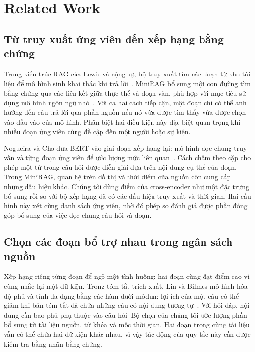 \section{Related Work}

\subsection{Từ truy xuất ứng viên đến xếp hạng bằng chứng}
Trong kiến trúc RAG của Lewis và cộng sự, bộ truy xuất tìm các đoạn từ kho tài liệu để mô hình sinh khai thác khi trả lời~\cite{lewis2020rag}. MiniRAG bổ sung một con đường tìm bằng chứng qua các liên kết giữa thực thể và đoạn văn, phù hợp với mục tiêu sử dụng mô hình ngôn ngữ nhỏ~\cite{fan2025minirag}. Với cả hai cách tiếp cận, một đoạn chỉ có thể ảnh hưởng đến câu trả lời qua phần nguồn nếu nó vừa được tìm thấy vừa được chọn vào đầu vào của mô hình. Phân biệt hai điều kiện này đặc biệt quan trọng khi nhiều đoạn ứng viên cùng đề cập đến một người hoặc sự kiện.

Nogueira và Cho đưa BERT vào giai đoạn xếp hạng lại: mô hình đọc chung truy vấn và từng đoạn ứng viên để ước lượng mức liên quan~\cite{nogueira2019passage}. Cách chấm theo cặp cho phép một từ trong câu hỏi được diễn giải dựa trên nội dung cụ thể của đoạn. Trong MiniRAG, quan hệ trên đồ thị và thời điểm của nguồn còn cung cấp những dấu hiệu khác. Chúng tôi dùng điểm của cross-encoder như một đặc trưng bổ sung rồi so với bộ xếp hạng đã có các dấu hiệu truy xuất và thời gian. Hai cấu hình này xét cùng danh sách ứng viên, nhờ đó phép so đánh giá được phần đóng góp bổ sung của việc đọc chung câu hỏi và đoạn.

\subsection{Chọn các đoạn bổ trợ nhau trong ngân sách nguồn}
Xếp hạng riêng từng đoạn để ngỏ một tình huống: hai đoạn cùng đạt điểm cao vì cùng nhắc lại một dữ kiện. Trong tóm tắt trích xuất, Lin và Bilmes mô hình hóa độ phủ và tính đa dạng bằng các hàm dưới môđun: lợi ích của một câu có thể giảm khi bản tóm tắt đã chứa những câu có nội dung tương tự~\cite{lin2011submodular}. Với hỏi đáp, nội dung cần bao phủ phụ thuộc vào câu hỏi. Bộ chọn của chúng tôi ước lượng phần bổ sung từ tài liệu nguồn, từ khóa và mốc thời gian. Hai đoạn trong cùng tài liệu vẫn có thể chứa hai dữ kiện khác nhau, vì vậy tác động của quy tắc này cần được kiểm tra bằng nhãn bằng chứng.


